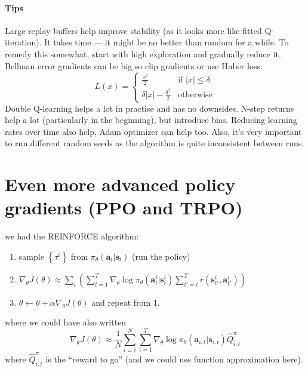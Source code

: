 \documentclass{report}
\begin{document}
\paragraph{Tips} Large replay buffers help improve stability (as it looks more like fitted Q-iteration).
It takes time --- it might be no better than random for a while. To remedy this somewhat, start with high exploration and gradually reduce it.
Bellman error gradients can be big so clip gradients or use Huber loss:
\begin{equation}
		L(x) = \left\{
				\begin{array}{ll}
						\frac{x^2}{2} & \text{if } |x|\leq \delta \\
						\delta|x| - \frac{\delta^2}{2} & \text{otherwise}
				\end{array}
				\right .
\end{equation}
Double Q-learning helps a lot in practise and has no downsides.
N-step returns help a lot (particularly in the beginning), but introduce bias.
Reducing learning rates over time also help, Adam optimizer can help too.
Also, it's very important to run different random seeds as the algorithm is quite inconsistent between runs.

\section{Even more advanced policy gradients (PPO and TRPO)}
we had the REINFORCE algorithm:
\begin{enumerate}
		\item sample $ \left\{ \tau^{ i } \right\}   $ from $ \pi_{ \theta } (\bm{a}_{t}| \bm{s}_{t} )  $ (run the policy)
		\item $ \nabla_{ \theta } J (\theta) \approx \sum_{i}^{} \left( \sum_{t=1}^{T} \nabla_{ \theta } \log \pi_{ \theta } (\bm{a}_{t}^{ i }| \bm{s}_{t}^{ i } )
		\sum_{t'=t}^{T} r (\bm{s}_{t'}^{ i }, \bm{a}_{t'}^{ i } ) \right)   $
\item $ \theta \leftarrow \theta + \alpha \nabla_{ \theta } J (\theta)  $ and repeat from 1.
\end{enumerate}
where we could have also written
\begin{equation}
		\nabla_{ \theta } J (\theta) \approx \frac{1}{N} \sum_{i=1}^{N} \sum_{t=1}^{T} \nabla_{ \theta } \log \pi_{ \theta } (\bm{a}_{i,t}| \bm{s}_{i,t} ) \hat{Q}_{ i,t }^{ \pi }
\end{equation}
where $ \hat{Q}_{ i,t }^{ \pi }  $ is the ``reward to go'' (and we could use function approximation here).
\end{document}
